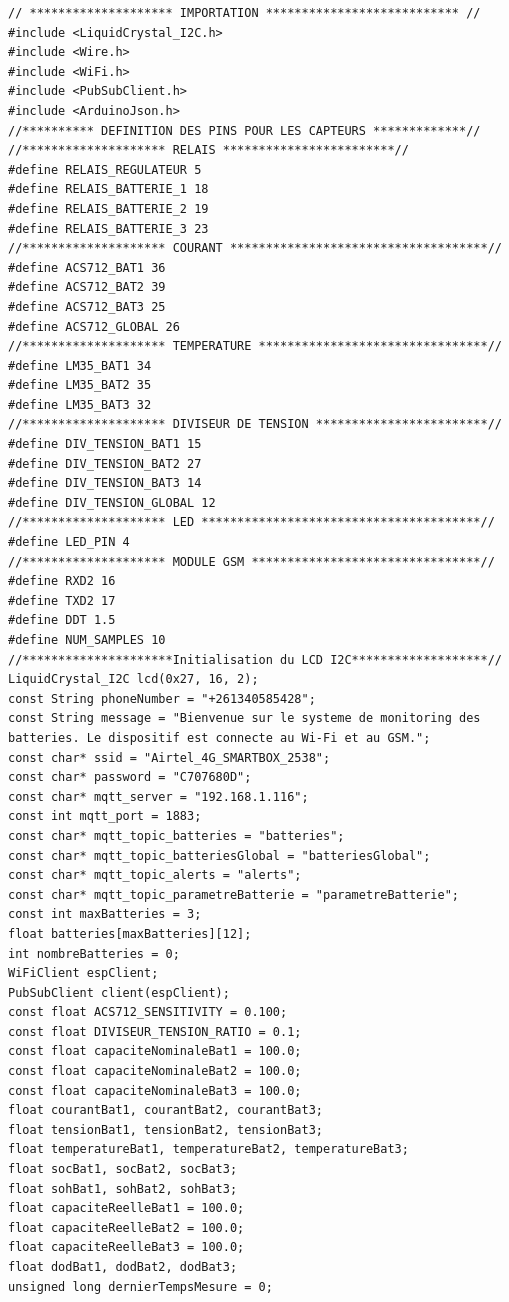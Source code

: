 \begin{lstlisting}[caption=Code de monitoring des batteries]
// ******************** IMPORTATION *************************** //
#include <LiquidCrystal_I2C.h>
#include <Wire.h>
#include <WiFi.h>
#include <PubSubClient.h>
#include <ArduinoJson.h>
//********** DEFINITION DES PINS POUR LES CAPTEURS *************//
//******************** RELAIS ************************//
#define RELAIS_REGULATEUR 5
#define RELAIS_BATTERIE_1 18
#define RELAIS_BATTERIE_2 19
#define RELAIS_BATTERIE_3 23
//******************** COURANT ************************************//
#define ACS712_BAT1 36
#define ACS712_BAT2 39
#define ACS712_BAT3 25
#define ACS712_GLOBAL 26
//******************** TEMPERATURE ********************************//
#define LM35_BAT1 34
#define LM35_BAT2 35
#define LM35_BAT3 32
//******************** DIVISEUR DE TENSION ************************//
#define DIV_TENSION_BAT1 15
#define DIV_TENSION_BAT2 27
#define DIV_TENSION_BAT3 14
#define DIV_TENSION_GLOBAL 12
//******************** LED ***************************************//
#define LED_PIN 4
//******************** MODULE GSM ********************************//
#define RXD2 16  
#define TXD2 17
#define DDT 1.5
#define NUM_SAMPLES 10
//*********************Initialisation du LCD I2C*******************//
LiquidCrystal_I2C lcd(0x27, 16, 2);
const String phoneNumber = "+261340585428";
const String message = "Bienvenue sur le systeme de monitoring des batteries. Le dispositif est connecte au Wi-Fi et au GSM.";  
const char* ssid = "Airtel_4G_SMARTBOX_2538"; 
const char* password = "C707680D"; 
const char* mqtt_server = "192.168.1.116"; 
const int mqtt_port = 1883;
const char* mqtt_topic_batteries = "batteries";
const char* mqtt_topic_batteriesGlobal = "batteriesGlobal";
const char* mqtt_topic_alerts = "alerts";
const char* mqtt_topic_parametreBatterie = "parametreBatterie";
const int maxBatteries = 3;
float batteries[maxBatteries][12]; 
int nombreBatteries = 0;
WiFiClient espClient;
PubSubClient client(espClient);
const float ACS712_SENSITIVITY = 0.100; 
const float DIVISEUR_TENSION_RATIO = 0.1; 
const float capaciteNominaleBat1 = 100.0;
const float capaciteNominaleBat2 = 100.0;
const float capaciteNominaleBat3 = 100.0;
float courantBat1, courantBat2, courantBat3;
float tensionBat1, tensionBat2, tensionBat3;
float temperatureBat1, temperatureBat2, temperatureBat3;
float socBat1, socBat2, socBat3; 
float sohBat1, sohBat2, sohBat3; 
float capaciteReelleBat1 = 100.0; 
float capaciteReelleBat2 = 100.0;
float capaciteReelleBat3 = 100.0;
float dodBat1, dodBat2, dodBat3; 
unsigned long dernierTempsMesure = 0;

\end{lstlisting}
